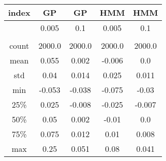 \centering \begin{tabular}{c|c|c|c|c}
index	&GP	&GP	&HMM	&HMM\\\hline
	&0.005	&0.1	&0.005	&0.1\\
	&	&	&	&\\
count	&2000.0	&2000.0	&2000.0	&2000.0\\
mean	&0.055	&0.002	&-0.006	&0.0\\
std	&0.04	&0.014	&0.025	&0.011\\
min	&-0.053	&-0.038	&-0.075	&-0.03\\
25\%	&0.025	&-0.008	&-0.025	&-0.007\\
50\%	&0.05	&0.002	&-0.01	&0.0\\
75\%	&0.075	&0.012	&0.01	&0.008\\
max	&0.25	&0.051	&0.08	&0.041\\
\end{tabular}
